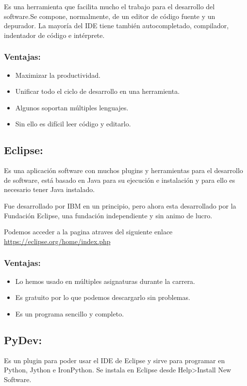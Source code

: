 Es una herramienta que facilita mucho el trabajo para el desarrollo del software.Se compone, normalmente, de un editor de código fuente y un depurador. La mayoría del IDE tiene también autocompletado, compilador, indentador de código e intérprete.

\subsubsection{Ventajas:}
\begin{itemize}
	\item Maximizar la productividad.
	\item Unificar todo el ciclo de desarrollo en una herramienta.
	\item Algunos soportan múltiples lenguajes. 
	\item Sin ello es difícil leer código y editarlo.
\end{itemize}

\subsection{Eclipse:}
Es una aplicación software con muchos plugins y herramientas para el desarrollo de software, está basado en Java para su ejecución e instalación y para ello es necesario tener Java instalado.

Fue desarrollado por IBM en un principio, pero ahora esta desarrollado por la Fundación Eclipse, una fundación independiente y sin animo de lucro.


Podemos acceder a la pagina atraves del siguiente enlace  \url{https://eclipse.org/home/index.php}

\subsubsection{Ventajas:}
\begin{itemize}
	\item Lo hemos usado en múltiples asignaturas durante la carrera.
	\item Es gratuito por lo que podemos descargarlo sin problemas.
	\item Es un programa sencillo y completo.
\end{itemize}

\subsection{PyDev:}
Es un plugin para poder usar el IDE de Eclipse y sirve para programar en Python, Jython e IronPython. Se instala en Eclipse desde Help>Install New Software. 

